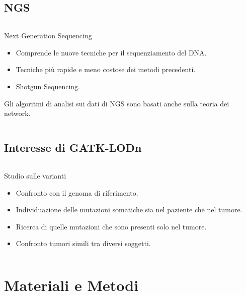\documentclass{beamer}
\begin{document}
\subsection{NGS}
\begin{frame}
\begin{columns}
\begin{column}{0.8\linewidth}
\begin{block}{Next Generation Sequencing}
\begin{itemize}
\item Comprende le nuove tecniche per il sequenziamento del 
DNA.
\item Tecniche più rapide e meno costose dei metodi precedenti.
\item Shotgun Sequencing.
\end{itemize}
\end{block}
\begin{block}{}
Gli algoritmi di analisi sui dati di NGS sono basati anche sulla teoria dei network.
\end{block}
\end{column}
\end{columns}
\end{frame}

\subsection{Interesse di GATK-LODn}
\begin{frame}
\begin{columns}
\begin{column}{0.8\linewidth}
\begin{block}{Studio sulle varianti}
\begin{itemize}
\item Confronto con il genoma di riferimento.
\item Individuazione delle mutazioni somatiche sia nel paziente che nel tumore.
\item Ricerca di quelle mutazioni che sono presenti solo nel tumore.
\item Confronto tumori simili tra diversi soggetti.
\end{itemize}
\end{block}
\end{column}
\end{columns}
\end{frame}

\section{Materiali e Metodi}
\end{document}
